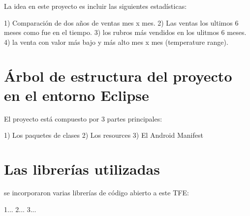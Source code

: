 La idea en este proyecto es incluir las siguientes estadísticas:

1) Comparaci\'on de dos años de ventas mes x mes.
2) Las ventas los ultimos 6 meses como fue en el tiempo.
3) los rubros más vendidos en los ulitmos 6 meses.
4) la venta con valor más bajo y más alto mes x mes (temperature range).

\section{\'Arbol de estructura del proyecto en el entorno Eclipse}
\label{sec:tpv.packages}

El proyecto est\'a compuesto por 3 partes principales:

1) Los paquetes de clases
2) Los resources
3) El Android Manifest


\section{Las librer\'ias utilizadas}
\label{sec:tpv.libraries}

se incorporaron varias librer\'ias de c\'odigo abierto a este \ac{TFE}:

1...
2...
3...

